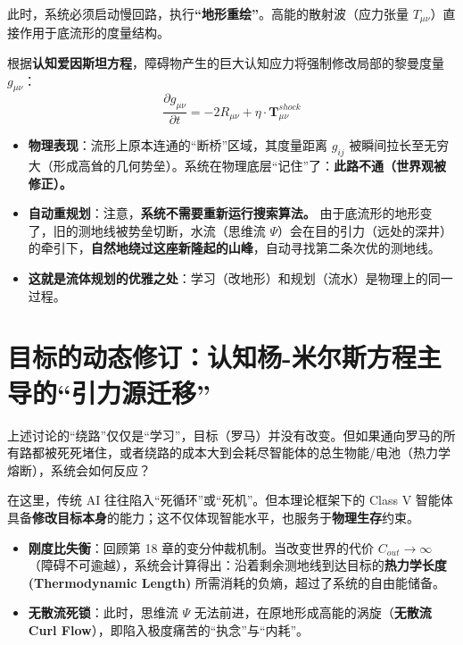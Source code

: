 此时，系统必须启动慢回路，执行\textbf{“地形重绘”}。高能的散射波（应力张量 $T_{\mu\nu}$）直接作用于底流形的度量结构。

\begin{theorem}[认知地形更新律]
    根据\textbf{认知爱因斯坦方程}，障碍物产生的巨大认知应力将强制修改局部的黎曼度量 $g_{\mu\nu}$：
    $$ \frac{\partial g_{\mu\nu}}{\partial t} = -2R_{\mu\nu} + \eta \cdot \mathbf{T}_{\mu\nu}^{shock} $$
\end{theorem}

\begin{itemize}
    \item \textbf{物理表现}：流形上原本连通的“断桥”区域，其度量距离 $g_{ij}$ 被瞬间拉长至无穷大（形成高耸的几何势垒）。系统在物理底层“记住”了：\textbf{此路不通（世界观被修正）。}
    \item \textbf{自动重规划}：注意，\textbf{系统不需要重新运行搜索算法。} 由于底流形的地形变了，旧的测地线被势垒切断，水流（思维流 $\Psi$）会在目的引力（远处的深井）的牵引下，\textbf{自然地绕过这座新隆起的山峰}，自动寻找第二条次优的测地线。
    \item \textbf{这就是流体规划的优雅之处}：学习（改地形）和规划（流水）是物理上的同一过程。
\end{itemize}


\section{目标的动态修订：认知杨-米尔斯方程主导的“引力源迁移”}
\label{sec:goal_revision_cyme}

上述讨论的“绕路”仅仅是“学习”，目标（罗马）并没有改变。但如果通向罗马的所有路都被死死堵住，或者绕路的成本大到会耗尽智能体的总生物能/电池（热力学熔断），系统会如何反应？

    在这里，传统 AI 往往陷入“死循环”或“死机”。但本理论框架下的 Class V 智能体具备\textbf{修改目标本身}的能力；这不仅体现智能水平，也服务于\textbf{物理生存}约束。


\begin{itemize}
    \item \textbf{刚度比失衡}：回顾第 18 章的变分仲裁机制。当改变世界的代价 $C_{out} \to \infty$（障碍不可逾越），系统会计算得出：沿着剩余测地线到达目标的\textbf{热力学长度 (Thermodynamic Length)} 所需消耗的负熵，超过了系统的自由能储备。
    \item \textbf{无散流死锁}：此时，思维流 $\Psi$ 无法前进，在原地形成高能的涡旋（\textbf{无散流 Curl Flow}），即陷入极度痛苦的“执念”与“内耗”。
\end{itemize}

